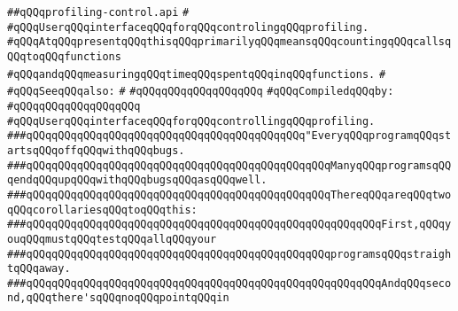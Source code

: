 \label{src/lib/compiler/debugging-and-profiling/profiling/profiling-control.api}
\verb|##qQQqprofiling-control.api|\newline
\verb|#|\newline
\verb|#qQQqUserqQQqinterfaceqQQqforqQQqcontrolingqQQqprofiling.|\newline
\verb|#qQQqAtqQQqpresentqQQqthisqQQqprimarilyqQQqmeansqQQqcountingqQQqcallsqQQqtoqQQqfunctions|\newline
\verb|#qQQqandqQQqmeasuringqQQqtimeqQQqspentqQQqinqQQqfunctions.|\newline
\verb|#|\newline
\verb|#qQQqSeeqQQqalso:|\newline
\verb|#|\newline
\verb|#qQQqqQQqqQQqqQQqqQQq|\newline
\newline
\verb|#qQQqCompiledqQQqby:|\newline
\verb|#qQQqqQQqqQQqqQQqqQQq|\newline
\newline
\newline
\newline
\verb|#qQQqUserqQQqinterfaceqQQqforqQQqcontrollingqQQqprofiling.|\newline
\newline
\newline
\newline
\verb|###qQQqqQQqqQQqqQQqqQQqqQQqqQQqqQQqqQQqqQQqqQQq"EveryqQQqprogramqQQqstartsqQQqoffqQQqwithqQQqbugs.|\newline
\verb|###qQQqqQQqqQQqqQQqqQQqqQQqqQQqqQQqqQQqqQQqqQQqqQQqManyqQQqprogramsqQQqendqQQqupqQQqwithqQQqbugsqQQqasqQQqwell.|\newline
\verb|###qQQqqQQqqQQqqQQqqQQqqQQqqQQqqQQqqQQqqQQqqQQqqQQqThereqQQqareqQQqtwoqQQqcorollariesqQQqtoqQQqthis:|\newline
\verb|###qQQqqQQqqQQqqQQqqQQqqQQqqQQqqQQqqQQqqQQqqQQqqQQqqQQqqQQqFirst,qQQqyouqQQqmustqQQqtestqQQqallqQQqyour|\newline
\verb|###qQQqqQQqqQQqqQQqqQQqqQQqqQQqqQQqqQQqqQQqqQQqqQQqprogramsqQQqstraightqQQqaway.|\newline
\verb|###qQQqqQQqqQQqqQQqqQQqqQQqqQQqqQQqqQQqqQQqqQQqqQQqqQQqqQQqAndqQQqsecond,qQQqthere'sqQQqnoqQQqpointqQQqin|\newline

